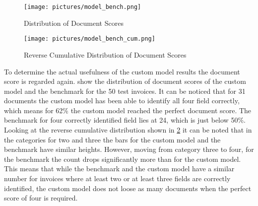 \begin{figure}[!ht]
    \centering 
    \texttt{[image: pictures/model\_bench.png]}
    \caption{Distribution of Document Scores}
    \label{pic:model_bench}    %
\end{figure}
\begin{figure}[!ht]
    \centering 
    \texttt{[image: pictures/model\_bench\_cum.png]}
    \caption{Reverse Cumulative Distribution of Document Scores}
    \label{pic:model_bench_cum}    %
\end{figure}

To determine the actual usefulness of the custom model results the document score is regarded again.
 show the distribution of document scores of the custom model and the benchmark for the 50 test invoices. 
It can be noticed that for 31 documents the custom model has been able to identify all four field correctly, which means for 62\% the custom model reached the perfect document score.
The benchmark for four correctly identified field lies at 24, which is just below 50\%.
Looking at the reverse cumulative distribution shown in \cref{pic:model_bench_cum} it can be noted that
in the categories for two and three the bars for the custom model and the benchmark have similar heights.
However, moving from category three to four, for the benchmark the count drops significantly more than for the custom model.
This means that while the benchmark and the custom model have a similar number for invoices where at least two or at least three fields are correctly identified,
the custom model does not loose as many documents when the perfect score of four is required.